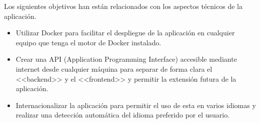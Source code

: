 Los siguientes objetivos han están relacionados con los aspectos técnicos de la
aplicación.

\begin{itemize}
    \item Utilizar Docker para facilitar el despliegue de la
    aplicación en cualquier equipo que tenga el motor de Docker instalado.
    \item Crear una API (Application Programming Interface) accesible mediante
    internet desde cualquier máquina para separar de forma clara el <<backend>>
    y el <<frontend>> y permitir la extensión futura de la aplicación.
    \item Internacionalizar la aplicación para permitir el uso de esta en varios
    idiomas y realizar una detección automática del idioma preferido por el
    usuario.
\end{itemize}